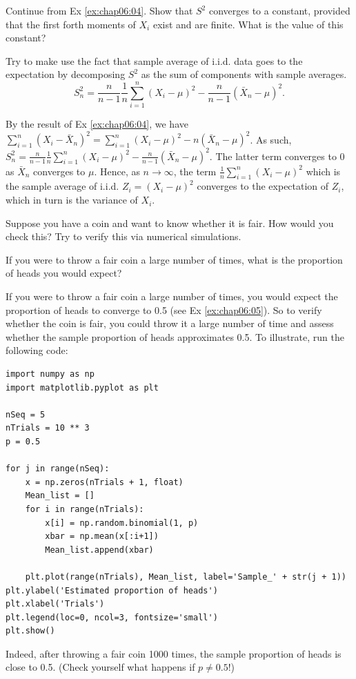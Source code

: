 	\begin{exercise}\label{ex:chap06:07}
	Continue from Ex \ref{ex:chap06:04}. Show that $S^2$ converges to a constant, provided that the first forth moments of $X_i$ exist and are finite. What is the value of this constant?
	\begin{hint}
		Try to make use the fact that sample average of i.i.d. data goes to the expectation by decomposing $S^2$ as the sum of components with sample averages.  $$S_n^2 = \frac{n}{n - 1}\frac{1}{n} \sum_{i = 1}^n (X_i - \mu)^2 - \frac{n}{n - 1} (\bar{X}_n - \mu)^2.$$
	\end{hint}
	\begin{solution}
		By the result of Ex \ref{ex:chap06:04}, we have $\sum_{i = 1}^n (X_i - \bar{X}_n)^2 = \sum_{i = 1}^n (X_i - \mu)^2 - n (\bar{X}_n - \mu)^2$. As such, $S_n^2 = \frac{n}{n - 1}\frac{1}{n} \sum_{i = 1}^n (X_i - \mu)^2 - \frac{n}{n - 1} (\bar{X}_n - \mu)^2$. The latter term converges to $0$ as $\bar{X}_n$ converges to $\mu$. Hence, as $n \to \infty$, the term $\frac{1}{n} \sum_{i = 1}^n (X_i - \mu)^2$ which is the sample average of i.i.d. $Z_i=(X_i - \mu)^2$ converges to the expectation of $Z_i$, which in turn is the variance of $X_i$. 
		\end{solution}
	\end{exercise}
	
	\begin{exercise} 
	Suppose you have a coin and want to know whether it is fair. How would you check this? Try to verify this via numerical simulations.
		\begin{hint}
			If you were to throw a fair coin a large number of times, what is the proportion of heads you would expect?
		\end{hint}
		\begin{solution}
		If you were to throw a fair coin a large number of times, you would expect the proportion of heads to converge to 0.5 (see Ex \ref{ex:chap06:05}). So to verify whether the coin is fair, you could throw it a large number of time and assess whether the sample proportion of heads approximates 0.5. To illustrate, run the following code:
\begin{verbatim}
import numpy as np
import matplotlib.pyplot as plt

nSeq = 5
nTrials = 10 ** 3
p = 0.5

for j in range(nSeq):
    x = np.zeros(nTrials + 1, float)
    Mean_list = []
    for i in range(nTrials):
        x[i] = np.random.binomial(1, p)
        xbar = np.mean(x[:i+1])
        Mean_list.append(xbar)

    plt.plot(range(nTrials), Mean_list, label='Sample_' + str(j + 1))
plt.ylabel('Estimated proportion of heads')
plt.xlabel('Trials')
plt.legend(loc=0, ncol=3, fontsize='small')
plt.show()
\end{verbatim}
		Indeed, after throwing a fair coin 1000 times, the sample proportion of heads is close to 0.5. (Check yourself what happens if $p \neq 0.5$!)
		\end{solution}
	\end{exercise}
	

